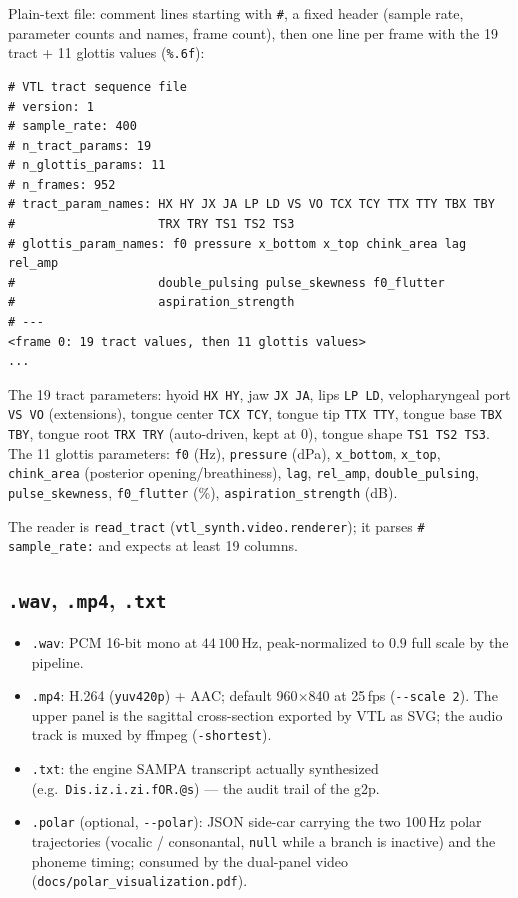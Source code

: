 \documentclass[11pt,a4paper]{article}
\begin{document}
Plain-text file: comment lines starting with \texttt{\#}, a fixed header
(sample rate, parameter counts and names, frame count), then one line per
frame with the 19 tract + 11 glottis values
(\texttt{\%.6f}):

\begin{lstlisting}[style=verbatim]
# VTL tract sequence file
# version: 1
# sample_rate: 400
# n_tract_params: 19
# n_glottis_params: 11
# n_frames: 952
# tract_param_names: HX HY JX JA LP LD VS VO TCX TCY TTX TTY TBX TBY
#                    TRX TRY TS1 TS2 TS3
# glottis_param_names: f0 pressure x_bottom x_top chink_area lag rel_amp
#                    double_pulsing pulse_skewness f0_flutter
#                    aspiration_strength
# ---
<frame 0: 19 tract values, then 11 glottis values>
...
\end{lstlisting}

The 19 tract parameters: hyoid \texttt{HX HY}, jaw \texttt{JX JA}, lips
\texttt{LP LD}, velopharyngeal port \texttt{VS VO} (extensions), tongue
center \texttt{TCX TCY}, tongue tip \texttt{TTX TTY}, tongue base
\texttt{TBX TBY}, tongue root \texttt{TRX TRY} (auto-driven, kept at 0),
tongue shape \texttt{TS1 TS2 TS3}. The 11 glottis parameters:
\texttt{f0} (Hz), \texttt{pressure} (dPa), \texttt{x\_bottom},
\texttt{x\_top}, \texttt{chink\_area} (posterior opening/breathiness),
\texttt{lag}, \texttt{rel\_amp}, \texttt{double\_pulsing},
\texttt{pulse\_skewness}, \texttt{f0\_flutter} (\%),
\texttt{aspiration\_strength} (dB).

The reader is \texttt{read\_tract} (\texttt{vtl\_synth.video.renderer});
it parses \texttt{\# sample\_rate:} and expects at least 19 columns.

\subsection{\texttt{.wav}, \texttt{.mp4}, \texttt{.txt}}

\begin{itemize}[leftmargin=1.5em]
\item \texttt{.wav}: PCM 16-bit mono at \(44\,100\,\mathrm{Hz}\),
      peak-normalized to \(0.9\) full scale by the pipeline.
\item \texttt{.mp4}: H.264 (\texttt{yuv420p}) + AAC; default
      960\(\times\)840 at 25\,fps (\texttt{-{}-scale 2}). The upper panel
      is the sagittal cross-section exported by VTL as SVG; the audio
      track is muxed by ffmpeg (\texttt{-shortest}).
\item \texttt{.txt}: the engine SAMPA transcript actually synthesized
      (e.g.\ \texttt{Dis.iz.i.zi.fOR.@s}) --- the audit trail of the g2p.
\item \texttt{.polar} (optional, \texttt{-{}-polar}): JSON side-car
      carrying the two 100\,Hz polar trajectories (vocalic /
      consonantal, \texttt{null} while a branch is inactive) and the
      phoneme timing; consumed by the dual-panel video
      (\texttt{docs/polar\_visualization.pdf}).
\end{itemize}
\end{document}
